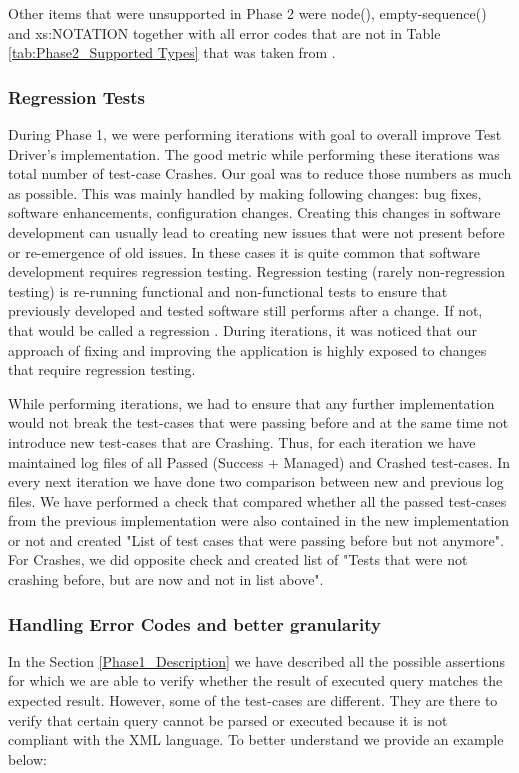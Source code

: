 Other items that were unsupported in Phase 2 were node(), empty-sequence() and xs:NOTATION together with all error codes that are not in Table \ref{tab:Phase2_Supported Types} that was taken from \cite{RumbleSupportedErrorCodes}.

\subsubsection{Regression Tests}
During Phase 1, we were performing iterations with goal to overall improve Test Driver's implementation. The good metric while performing these iterations was total number of test-case Crashes. Our goal was to reduce those numbers as much as possible. This was mainly handled by making following changes: bug fixes, software enhancements, configuration changes. Creating this changes in software development can usually lead to creating new issues that were not present before or re-emergence of old issues. In these cases it is quite common that software development requires regression testing. Regression testing (rarely non-regression testing) is re-running functional and non-functional tests to ensure that previously developed and tested software still performs after a change. If not, that would be called a regression \cite{RegressionTesting}. During iterations, it was noticed that our approach of fixing and improving the application is highly exposed to changes that require regression testing. 

While performing iterations, we had to ensure that any further implementation would not break the test-cases that were passing before and at the same time not introduce new test-cases that are Crashing. Thus, for each iteration we have maintained log files of all Passed (Success + Managed) and Crashed test-cases. In every next iteration we have done two comparison between new and previous log files. We have performed a check that compared whether all the passed test-cases from the previous implementation were also contained in the new implementation or not and created "List of test cases that were passing before but not anymore". For Crashes, we did opposite check and created list of "Tests that were not crashing before, but are now and not in list above". 

\subsubsection{Handling Error Codes and better granularity}
In the Section \ref{Phase1_Description} we have described all the possible assertions for which we are able to verify whether the result of executed query matches the expected result. However, some of the test-cases are different. They are there to verify that certain query cannot be parsed or executed because it is not compliant with the XML language. To better understand we provide an example below:

